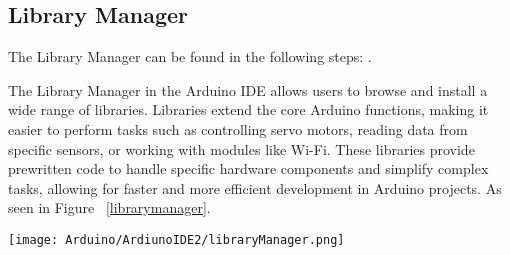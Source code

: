 \subsection{Library Manager}
The Library Manager can be found in the following steps: .

The Library Manager in the Arduino IDE allows users to browse and install a wide range of libraries. Libraries extend the core Arduino functions, making it easier to perform tasks such as controlling servo motors, reading data from specific sensors, or working with modules like Wi-Fi. 
These libraries provide prewritten code to handle specific hardware components and simplify complex tasks, allowing for faster and more efficient development in Arduino projects. As seen in Figure ~\ref{librarymanager}.














\begin{center}
        \texttt{[image: Arduino/ArdiunoIDE2/libraryManager.png]}
        \label{librarymanager}
\end{center}







